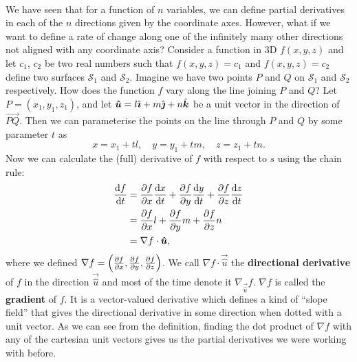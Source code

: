 \documentclass[../multivariate_calculus.tex]{subfiles}
\begin{document}
        \paragraph{}
        We have seen that for a function of $n$ variables, we can define partial derivatives in each of the $n$ directions given by the coordinate axes.
        However, what if we want to define a rate of change along one of the infinitely many other directions not aligned with any coordinate axis?
        Consider a function in 3D $f(x,y,z)$ and let $c_1$, $c_2$ be two real numbers such that $f(x,y,z)=c_1$ and $f(x,y,z)=c_2$ define two surfaces $\mathcal{S}_1$ and $\mathcal{S}_2$.
        Imagine we have two points $P$ and $Q$ on $\mathcal{S}_1$ and $\mathcal{S}_2$ respectively.
        How does the function $f$ vary along the line joining $P$ and $Q$?
        Let $P=(x_1,y_1,z_1)$, and let $\boldsymbol{\hat{u}}=l\hat{\boldsymbol{\imath}}+m\hat{\boldsymbol{\jmath}}+n\hat{\boldsymbol{k}}$ be a unit vector in the direction of $\overrightarrow{PQ}$.
        Then we can parameterise the points on the line through $P$ and $Q$ by some parameter $t$ as
        \begin{equation}
            x=x_1+tl,\quad y=y_1+tm,\quad z=z_1+tn.
        \end{equation}
        Now we can calculate the (full) derivative of $f$ with respect to $s$ using the chain rule:
        \begin{align}
            \dv{f}{t}&=\pdv{f}{x}\dv{x}{t}+\pdv{f}{y}\dv{y}{t}+\pdv{f}{z}\dv{z}{t}\\
            &=\pdv{f}{x}l+\pdv{f}{y}m+\pdv{f}{z}n\\
            &=\nabla f\cdot\vec{\hat{u}},
        \end{align}
        where we defined $\nabla f=\left(\pdv{f}{x},\pdv{f}{y},\pdv{f}{z}\right)$.
        We call $\nabla f\cdot\vec{\hat{u}}$ the \textbf{directional derivative} of $f$ in the direction $\vec{\hat{u}}$ and most of the time denote it $\nabla_{\vec{\hat{u}}}f$.
        $\nabla f$ is called the \textbf{gradient} of $f$.
        It is a vector-valued derivative which defines a kind of ``slope field'' that gives the directional derivative in some direction when dotted with a unit vector.
        As we can see from the definition, finding the dot product of $\nabla f$ with any of the cartesian unit vectors gives us the partial derivatives we were working with before.
\end{document}
